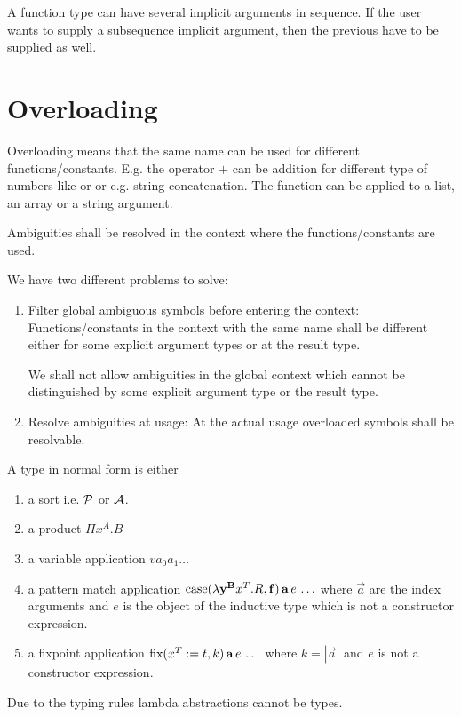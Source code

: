 A function type can have several implicit arguments in sequence. If the user
wants to supply a subsequence implicit argument, then the previous have to be
supplied as well.











\vskip 5mm
\section{Overloading}

Overloading means that the same name can be used for different
functions/constants. E.g. the operator $+$ can be addition for different type of
numbers like  or  or e.g. string concatenation. The
function  can be applied to a list, an array or a string argument.

Ambiguities shall be resolved in the context where the functions/constants are
used.

We have two different problems to solve:
\begin{enumerate}

\item Filter global ambiguous symbols before entering the context:
Functions/constants in the context with the same name shall be different either
for some explicit argument types or at the result type.

We shall not allow ambiguities in the global context which cannot be
distinguished by some explicit argument type or the result type.


\item Resolve ambiguities at usage: At the actual usage overloaded symbols shall
be resolvable.

\end{enumerate}

A type in normal form is either
\begin{enumerate}

\item a sort i.e. ${\cal{P}}$ or ${\cal{A}}$.

\item a product $\Pi x^A. B$

\item a variable application $v a_0 a_1 \ldots$

\item a pattern match application
    $\text{case}(\lambda \mathbf{y}^{\mathbf{B}} x^T. R, \mathbf{f}) \,\mathbf{a}\, e\, \ldots$
    where $\vec{a}$ are the index arguments and $e$ is the object of the
    inductive type which is not a constructor expression.

\item a fixpoint application
    $\text{fix}(x^T := t, k)\, \mathbf{a}\, e\, \ldots$
    where $k = |\vec{a}|$ and $e$ is not a constructor expression.
\end{enumerate}
%
Due to the typing rules lambda abstractions cannot be types.





